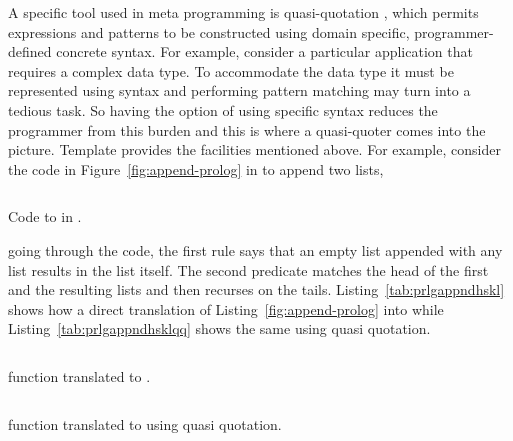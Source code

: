 \documentclass[thesis-solanki.tex]{subfiles}
\begin{document}
A specific tool used in meta programming is quasi-quotation \cite{mainland2007s,haskellquasi,wikiquasi}, which
permits  expressions and patterns to be constructed using domain specific,
pro\-gram\-mer-de\-fined concrete syntax.
For example, consider a particular application that requires a complex data type.
To accommodate the data type it must be represented
using  syntax and performing pattern matching may turn into a tedious task.
So having the option of using specific syntax reduces the programmer from this burden and this is where a
quasi-quoter comes into the picture.
Template  provides the facilities mentioned above.
For example, consider the code in Figure~\ref{fig:append-prolog}
in  to append two lists,
\begin{code-list}[h]
\begin{singlespace}
\inputminted[linenos]{prolog}{prolog-background-append.pl}
\end{singlespace}   
\caption{Code to  in \protect{}.}
\label{fig:append-prolog}
\end{code-list}
going through the code, the first rule says that an empty list appended with any list results in the list itself.
The second predicate matches the head of the first and the resulting lists and then recurses on the tails.
Listing~\ref{tab:prlgappndhskl} shows how a direct translation of Listing~\ref{fig:append-prolog} into
 while Listing~\ref{tab:prlgappndhsklqq} shows the same using quasi quotation.

\begin{code-list}[th]
  \begin{singlespace}
    \inputminted[linenos]{haskell}{append_no_quasi.hs}
  \end{singlespace}
  \caption{  function translated to .}
\label{tab:prlgappndhskl}
\end{code-list}

\begin{code-list}[th]
  \begin{singlespace}
    \inputminted[linenos]{haskell}{append_quasi_quote.hs}
  \end{singlespace}
  \caption{  function translated to  using quasi quotation.}
\label{tab:prlgappndhsklqq}
\end{code-list}
\end{document}
